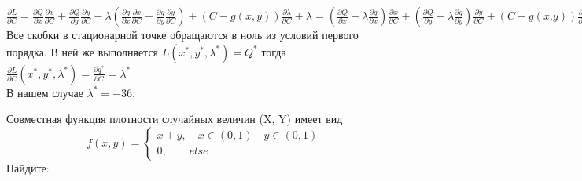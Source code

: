 \documentclass[addpoints, answers]{exam} %
\begin{document}
\begin{questions}
\begin{solution}
$\frac{\partial L}{\partial C}=\frac{\partial Q }{\partial x}\frac{\partial x}{\partial C}+\frac{\partial Q}{\partial y}\frac{\partial y}{\partial C}-\lambda(\frac{\partial g}{\partial x}\frac{\partial x }{\partial C}+\frac{\partial g}{\partial y}\frac{\partial y}{\partial C })+(C-g(x,y))\frac{\partial \lambda}{\partial C}+\lambda= (\frac{\partial Q}{\partial x}-\lambda \frac{\partial g}{\partial x})\frac{\partial x}{\partial C}+(\frac{\partial Q}{\partial y}-\lambda \frac{\partial g}{\partial y})\frac{\partial y}{\partial C}+(C-g(x.y))\frac{\partial \lambda}{\partial C}+\lambda$
Все скобки в стационарной точке обращаются в ноль из условий первого порядка. В ней же выполняется $L(x^*,y^*,\lambda^*)=Q^*$ тогда $\frac{\partial L}{\partial C}(x^*,y^*,\lambda^*)=\frac{\partial q^*}{\partial C}=\lambda^*$\\
В нашем случае $\lambda^*=-36$.

\end{solution}

\question	Совместная функция плотности случайных величин (X, Y) имеет вид
\[
f(x,y)=
\begin{cases}
x+y, \quad x \in (0,1) \quad y \in (0,1)\\
0, \quad \quad else
\end{cases}
\]
Найдите: 
\end{questions}
\end{document}
